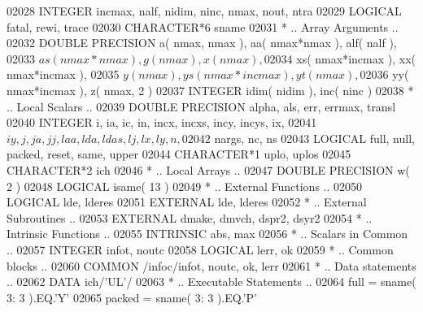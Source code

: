 \begin{DoxyCode}
02028       \textcolor{keywordtype}{INTEGER}            incmax, nalf, nidim, ninc, nmax, nout, ntra
02029       \textcolor{keywordtype}{LOGICAL}            fatal, rewi, trace
02030       \textcolor{keywordtype}{CHARACTER*6}        sname
02031 \textcolor{comment}{*     .. Array Arguments ..}
02032       \textcolor{keywordtype}{DOUBLE PRECISION}   a( nmax, nmax ), aa( nmax*nmax ), alf( nalf ),
02033      $                   as( nmax*nmax ), g( nmax ), x( nmax ),
02034      $                   xs( nmax*incmax ), xx( nmax*incmax ),
02035      $                   y( nmax ), ys( nmax*incmax ), yt( nmax ),
02036      $                   yy( nmax*incmax ), z( nmax, 2 )
02037       \textcolor{keywordtype}{INTEGER}            idim( nidim ), inc( ninc )
02038 \textcolor{comment}{*     .. Local Scalars ..}
02039       \textcolor{keywordtype}{DOUBLE PRECISION}   alpha, als, err, errmax, transl
02040       \textcolor{keywordtype}{INTEGER}            i, ia, ic, in, incx, incxs, incy, incys, ix,
02041      $                   iy, j, ja, jj, laa, lda, ldas, lj, lx, ly, n,
02042      $                   nargs, nc, ns
02043       \textcolor{keywordtype}{LOGICAL}            full, null, packed, reset, same, upper
02044       \textcolor{keywordtype}{CHARACTER*1}        uplo, uplos
02045       \textcolor{keywordtype}{CHARACTER*2}        ich
02046 \textcolor{comment}{*     .. Local Arrays ..}
02047       \textcolor{keywordtype}{DOUBLE PRECISION}   w( 2 )
02048       \textcolor{keywordtype}{LOGICAL}            isame( 13 )
02049 \textcolor{comment}{*     .. External Functions ..}
02050       \textcolor{keywordtype}{LOGICAL}            lde, lderes
02051       \textcolor{keywordtype}{EXTERNAL}           lde, lderes
02052 \textcolor{comment}{*     .. External Subroutines ..}
02053       \textcolor{keywordtype}{EXTERNAL}           dmake, dmvch, dspr2, dsyr2
02054 \textcolor{comment}{*     .. Intrinsic Functions ..}
02055       \textcolor{keywordtype}{INTRINSIC}          abs, max
02056 \textcolor{comment}{*     .. Scalars in Common ..}
02057       \textcolor{keywordtype}{INTEGER}            infot, noutc
02058       \textcolor{keywordtype}{LOGICAL}            lerr, ok
02059 \textcolor{comment}{*     .. Common blocks ..}
02060       \textcolor{keyword}{COMMON}             /infoc/infot, noutc, ok, lerr
02061 \textcolor{comment}{*     .. Data statements ..}
02062       \textcolor{keyword}{DATA}               ich/\textcolor{stringliteral}{'UL'}/
02063 \textcolor{comment}{*     .. Executable Statements ..}
02064       full = sname( 3: 3 ).EQ.\textcolor{stringliteral}{'Y'}
02065       packed = sname( 3: 3 ).EQ.\textcolor{stringliteral}{'P'}

\end{DoxyCode}
